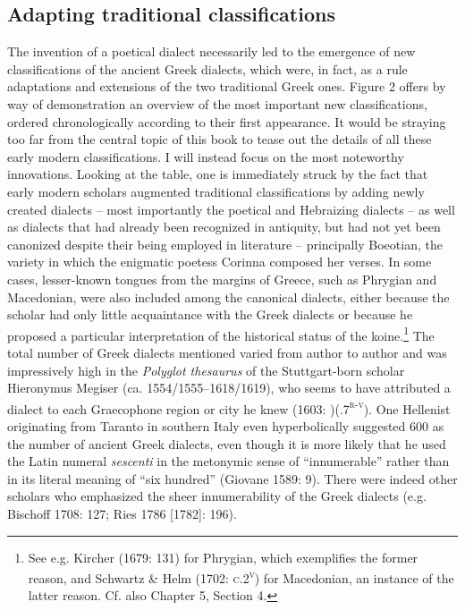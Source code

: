 \subsection{Adapting traditional classifications}
\hypertarget{Toc19704814}{}\begin{styleStandard}
The invention of a poetical dialect necessarily led to the emergence of new classifications of the ancient Greek dialects, which were, in fact, as a rule adaptations and extensions of the two traditional Greek ones. Figure 2 offers by way of demonstration an overview of the most important new classifications, ordered chronologically according to their first appearance. It would be straying too far from the central topic of this book to tease out the details of all these early modern classifications. I will instead focus on the most noteworthy innovations. Looking at the table, one is immediately struck by the fact that early modern scholars augmented traditional classifications by adding newly created dialects – most importantly the poetical and Hebraizing dialects – as well as dialects that had already been recognized in antiquity, but had not yet been canonized despite their being employed in literature – principally Boeotian, the variety in which the enigmatic poetess Corinna composed her verses. In some cases, lesser-known tongues from the margins of Greece, such as Phrygian and Macedonian, were also included among the canonical dialects, either because the scholar had only little acquaintance with the Greek dialects or because he proposed a particular interpretation of the historical status of the koine.\footnote{ See e.g. Kircher (1679: 131) for Phrygian, which exemplifies the former reason, and Schwartz \& Helm (1702: \textsc{c.2}\textsc{\textsuperscript{v}}) for Macedonian, an instance of the latter reason. Cf. also Chapter 5, Section 4.} The total number of Greek dialects mentioned varied from author to author and was impressively high in the \textit{Polyglot thesaurus} of the Stuttgart-born scholar Hieronymus Megiser (ca. 1554/1555–1618/1619), who seems to have attributed a dialect to each Graecophone region or city he knew (1603: )(.7\textsc{\textsuperscript{r-v}}). One Hellenist originating from Taranto in southern Italy even hyperbolically suggested 600 as the number of ancient Greek dialects, even though it is more likely that he used the Latin numeral \textit{sescenti} in the metonymic sense of “innumerable” rather than in its literal meaning of “six hundred” (Giovane 1589: 9). There were indeed other scholars who emphasized the sheer innumerability of the Greek dialects (e.g. Bischoff 1708: 127; Ries 1786 [1782]: 196).
\end{styleStandard}

